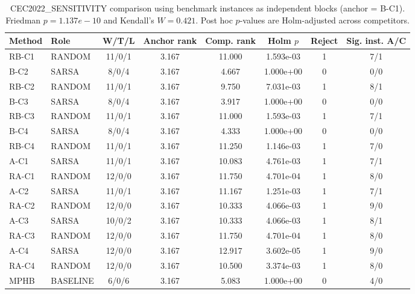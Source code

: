\begin{table}[!t]
\centering
\footnotesize
\caption{CEC2022\_SENSITIVITY comparison using benchmark instances as independent blocks (anchor = B-C1). Friedman $p=1.137e-10$ and Kendall's $W=0.421$. Post hoc $p$-values are Holm-adjusted across competitors.}
\begin{tabular}{llcccccc}
\hline
Method & Role & W/T/L & Anchor rank & Comp. rank & Holm $p$ & Reject & Sig. inst. A/C \\
\hline
RB-C1 & RANDOM & 11/0/1 & 3.167 & 11.000 & 1.593e-03 & 1 & 7/1 \\
B-C2 & SARSA & 8/0/4 & 3.167 & 4.667 & 1.000e+00 & 0 & 0/0 \\
RB-C2 & RANDOM & 11/0/1 & 3.167 & 9.750 & 7.031e-03 & 1 & 8/1 \\
B-C3 & SARSA & 8/0/4 & 3.167 & 3.917 & 1.000e+00 & 0 & 0/0 \\
RB-C3 & RANDOM & 11/0/1 & 3.167 & 11.000 & 1.593e-03 & 1 & 7/1 \\
B-C4 & SARSA & 8/0/4 & 3.167 & 4.333 & 1.000e+00 & 0 & 0/0 \\
RB-C4 & RANDOM & 11/0/1 & 3.167 & 11.250 & 1.146e-03 & 1 & 7/0 \\
A-C1 & SARSA & 11/0/1 & 3.167 & 10.083 & 4.761e-03 & 1 & 7/1 \\
RA-C1 & RANDOM & 12/0/0 & 3.167 & 11.750 & 4.701e-04 & 1 & 8/0 \\
A-C2 & SARSA & 11/0/1 & 3.167 & 11.167 & 1.251e-03 & 1 & 7/1 \\
RA-C2 & RANDOM & 12/0/0 & 3.167 & 10.333 & 4.066e-03 & 1 & 9/0 \\
A-C3 & SARSA & 10/0/2 & 3.167 & 10.333 & 4.066e-03 & 1 & 8/1 \\
RA-C3 & RANDOM & 12/0/0 & 3.167 & 11.750 & 4.701e-04 & 1 & 8/0 \\
A-C4 & SARSA & 12/0/0 & 3.167 & 12.917 & 3.602e-05 & 1 & 9/0 \\
RA-C4 & RANDOM & 12/0/0 & 3.167 & 10.500 & 3.374e-03 & 1 & 8/0 \\
MPHB & BASELINE & 6/0/6 & 3.167 & 5.083 & 1.000e+00 & 0 & 4/0 \\
\hline
\end{tabular}
\end{table}
